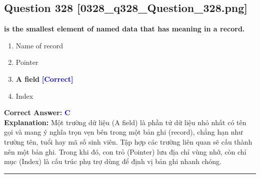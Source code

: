 \documentclass[11pt,a4paper]{article}
\begin{document}
\begin{minipage}{\textwidth}
\subsection*{Question 328 \quad \footnotesize{[0328\_q328\_Question\_328.png]}}
\noindent \textbf{is the smallest element of named data that has meaning in a record.}

\begin{enumerate}[label=\Alph*.]
    \item Name of record
    \item Pointer
    \item \textbf{A field} \hfill \textcolor{blue}{\textbf{[Correct]}}
    \item Index
\end{enumerate}

\noindent \textbf{Correct Answer:} \textcolor{blue}{\textbf{C}} \\[2pt]
\noindent \textbf{Explanation:} Một trường dữ liệu (A field) là phần tử dữ liệu nhỏ nhất có tên gọi và mang ý nghĩa trọn vẹn bên trong một bản ghi (record), chẳng hạn như trường tên, tuổi hay mã số sinh viên. Tập hợp các trường liên quan sẽ cấu thành nên một bản ghi. Trong khi đó, con trỏ (Pointer) lưu địa chỉ vùng nhớ, còn chỉ mục (Index) là cấu trúc phụ trợ dùng để định vị bản ghi nhanh chóng.

\par\vspace{0.3cm}
\hrule
\vspace{0.3cm}
\end{minipage}
\end{document}
